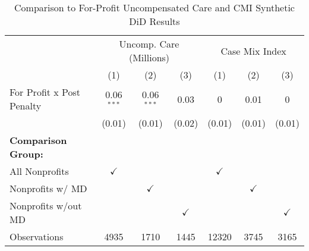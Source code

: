 \begin{table}[ht!]

\caption{\label{tab:forprofit_uncompCMI_synth} Comparison to For-Profit Uncompensated Care and CMI Synthetic DiD Results}
\centering
\begin{tabular}[t]{lcccccc}
\toprule
\multicolumn{1}{c}{ } & \multicolumn{3}{c}{Uncomp. Care (Millions)} & \multicolumn{3}{c}{Case Mix Index} \\
\cmidrule(l{3pt}r{3pt}){2-4} \cmidrule(l{3pt}r{3pt}){5-7}
 & (1) & (2) & (3) & (1) & (2) & (3)\\
\midrule
For Profit x Post Penalty & 0.06$^{***}$ & 0.06$^{***}$ & 0.03 & 0 & 0.01 & 0\\
 & (0.01) & (0.01) & (0.02) & (0.01) & (0.01) & (0.01)\\
\textbf{Comparison Group:} &  &  &  &  &  & \\
All Nonprofits & $\checkmark$ &  &  & $\checkmark$ &  & \\
Nonprofits w/ MD &  & $\checkmark$ &  &  & $\checkmark$ & \\
\addlinespace
Nonprofits w/out MD &  &  & $\checkmark$ &  &  & $\checkmark$\\
Observations & 4935 & 1710 & 1445 & 12320 & 3745 & 3165\\
\bottomrule
\end{tabular}
\end{table}
